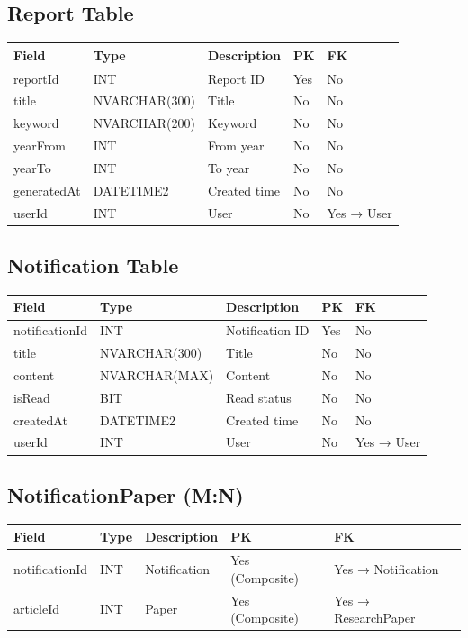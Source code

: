 \documentclass[12pt,a4paper]{article}
\begin{document}
{{%
\subsection{Report Table}
\begin{longtable}{|p{3cm}|p{3cm}|p{6cm}|p{1.5cm}|p{1.5cm}|}
	\hline
	Field & Type & Description & PK & FK \\
	\hline
	reportId & INT & Report ID & Yes & No \\
	title & NVARCHAR(300) & Title & No & No \\
	keyword & NVARCHAR(200) & Keyword & No & No \\
	yearFrom & INT & From year & No & No \\
	yearTo & INT & To year & No & No \\
	generatedAt & DATETIME2 & Created time & No & No \\
	userId & INT & User & No & Yes → User \\
	\hline
\end{longtable}

\subsection{Notification Table}
\begin{longtable}{|p{3cm}|p{3cm}|p{6cm}|p{1.5cm}|p{1.5cm}|}
	\hline
	Field & Type & Description & PK & FK \\
	\hline
	notificationId & INT & Notification ID & Yes & No \\
	title & NVARCHAR(300) & Title & No & No \\
	content & NVARCHAR(MAX) & Content & No & No \\
	isRead & BIT & Read status & No & No \\
	createdAt & DATETIME2 & Created time & No & No \\
	userId & INT & User & No & Yes → User \\
	\hline
\end{longtable}

\subsection{NotificationPaper (M:N)}
\begin{longtable}{|p{3cm}|p{3cm}|p{6cm}|p{1.5cm}|p{1.5cm}|}
	\hline
	Field & Type & Description & PK & FK \\
	\hline
	notificationId & INT & Notification & Yes (Composite) & Yes → Notification \\
	articleId & INT & Paper & Yes (Composite) & Yes → ResearchPaper \\
	\hline
\end{longtable}

}}
\end{document}
